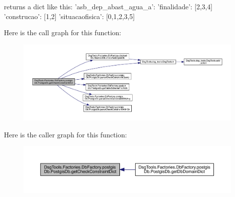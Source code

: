 \begin{DoxyVerb}returns a dict like this:
{'asb_dep_abast_agua_a': {
'finalidade': [2,3,4]
'construcao': [1,2]
'situacaofisica': [0,1,2,3,5]
    }
}
\end{DoxyVerb}
 Here is the call graph for this function\+:
\nopagebreak
\begin{figure}[H]
\begin{center}
\leavevmode
\includegraphics[width=350pt]{class_dsg_tools_1_1_factories_1_1_db_factory_1_1postgis_db_1_1_postgis_db_a49aa7680effc4959070cf54be941d5ad_cgraph}
\end{center}
\end{figure}
Here is the caller graph for this function\+:
\nopagebreak
\begin{figure}[H]
\begin{center}
\leavevmode
\includegraphics[width=350pt]{class_dsg_tools_1_1_factories_1_1_db_factory_1_1postgis_db_1_1_postgis_db_a49aa7680effc4959070cf54be941d5ad_icgraph}
\end{center}
\end{figure}
\mbox{\label{class_dsg_tools_1_1_factories_1_1_db_factory_1_1postgis_db_1_1_postgis_db_afe374d35d99247bce7b727441e0287e8}} 
